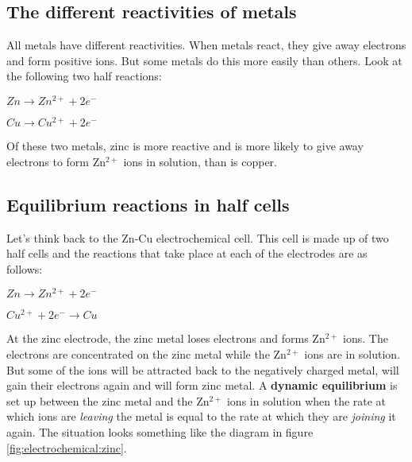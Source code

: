 \subsection{The different reactivities of metals}
\label{subsec:electrochemical:metal reactivity}

All metals have different reactivities. When metals react, they give away electrons and form positive ions. But some metals do this more easily than others. Look at the following two half reactions:

\begin{center}
\rm${Zn \rightarrow Zn^{2+} + 2e^{-}}$

\rm${Cu \rightarrow Cu^{2+} + 2e^{-}}$
\end{center}

Of these two metals, zinc is more reactive and is more likely to give away electrons to form Zn$^{2+}$ ions in solution, than is copper.

\subsection{Equilibrium reactions in half cells}
\label{subsec:electrochemical:equilibrium reactions}

Let's think back to the Zn-Cu electrochemical cell. This cell is made up of two half cells and the reactions that take place at each of the electrodes are as follows:

\begin{center}
\rm${Zn \rightarrow Zn^{2+} + 2e^{-}}$

\rm${Cu^{2+} + 2e^{-} \rightarrow Cu}$
\end{center}

At the zinc electrode, the zinc metal loses electrons and forms Zn$^{2+}$ ions. The electrons are concentrated on the zinc metal while the Zn$^{2+}$ ions are in solution. But some of the ions will be attracted back to the negatively charged metal, will gain their electrons again and will form zinc metal. A \textbf{dynamic equilibrium} is set up between the zinc metal and the Zn$^{2+}$ ions in solution when the rate at which ions are \textit{leaving} the metal is equal to the rate at which they are \textit{joining} it again. The situation looks something like the diagram in figure \ref{fig:electrochemical:zinc}.

